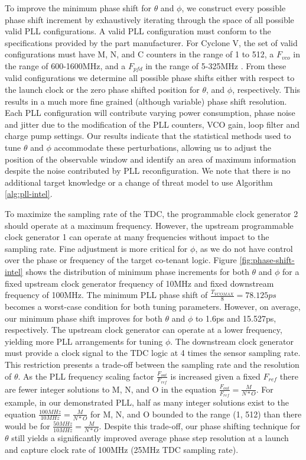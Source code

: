 To improve the minimum phase shift for $\theta$ and $\phi$, we construct every possible phase shift increment by exhaustively iterating through the space of all possible valid PLL configurations. A valid PLL configuration must conform to the specifications provided by the part manufacturer. For Cyclone V, the set of valid configurations must have M, N, and C counters in the range of 1 to 512, a $F_{vco}$ in the range of 600-1600MHz, and a $F_{pfd}$ in the range of 5-325MHz \cite{intel_pll-spec}. From these valid configurations we determine all possible phase shifts either with respect to the launch clock or the zero phase shifted position for $\theta$, and $\phi$, respectively. This results in a much more fine grained (although variable) phase shift resolution. Each PLL configuration will contribute varying power consumption, phase noise and jitter due to the modification of the PLL counters, VCO gain, loop filter and charge pump settings. Our results indicate that the statistical methods used to tune $\theta$ and $\phi$ accommodate these perturbations, allowing us to adjust the position of the observable window and identify an area of maximum information despite the noise contributed by PLL reconfiguration. We note that there is no additional target knowledge or a change of threat model to use Algorithm \ref{alg:pll-intel}.



To maximize the sampling rate of the \sensor TDC, the programmable clock generator \textcircled{\raisebox{-.9pt} {2}} should operate at a maximum frequency. However, the upstream programmable clock generator \textcircled{\raisebox{-.9pt} {1}} can operate at many frequencies without impact to the sampling rate. Fine adjustment is more critical for $\phi$, as we do not have control over the phase or frequency of the target co-tenant logic. Figure \ref{fig:phase-shift-intel} shows the distribution of minimum phase increments for both $\theta$ and $\phi$ for a fixed upstream clock generator frequency of 10MHz and fixed downstream frequency of 100MHz. The minimum PLL phase shift of $\frac{T_{VCOMAX}}{8}=78.125ps$ becomes a worst-case condition for both tuning parameters. However, on average, our minimum phase shift improves for both $\theta$ and $\phi$ to 1.6ps and 15.527ps, respectively. The upstream clock generator can operate at a lower frequency, yielding more PLL arrangements for tuning $\phi$. The downstream clock generator must provide a clock signal to the TDC logic at 4 times the sensor sampling rate. This restriction presents a trade-off between the sampling rate and the resolution of $\theta$. As the PLL frequency scaling factor $\frac{F_{out}}{F_{ref}}$ is increased given a fixed $F_{ref}$ there are fewer integer solutions to M, N, and O in the equation $\frac{F_{out}}{F_{ref}}=\frac{M}{N*O}$. For example, in our demonstrated PLL, half as many integer solutions exist to the equation $\frac{100MHz}{10MHz} =\frac{M}{N*O}$ for M, N, and O bounded to the range (1, 512) than there would be for $\frac{50MHz}{10MHz} =\frac{M}{N*O}$. Despite this trade-off, our phase shifting technique for $\theta$ still yields a significantly improved average phase step resolution at a launch and capture clock rate of 100MHz (25MHz TDC sampling rate). 

